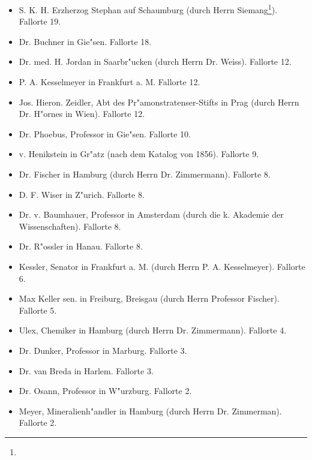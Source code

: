 \documentclass[a4paper, 11pt, oneside]{article}
\begin{document}
\begin{itemize}
    \item S. K. H. Erzherzog Stephan auf Schaumburg (durch Herrn Siemang\footnote{}). Fallorte 19.

    \item Dr. Buchner in Gie"sen. Fallorte 18.

    \item Dr. med. H. Jordan in Saarbr"ucken (durch Herrn Dr. Weiss). Fallorte 12.

    \item P. A. Kesselmeyer in Frankfurt a. M. Fallorte 12.

    \item Jos. Hieron. Zeidler, Abt des Pr"amonstratenser-Stifts in Prag (durch Herrn Dr. H"ornes in Wien). Fallorte 12.

    \item Dr. Phoebus, Professor in Gie"sen. Fallorte 10.

    \item v. Henikstein in Gr"atz (nach dem Katalog von 1856). Fallorte 9.

    \item Dr. Fischer in Hamburg (durch Herrn Dr. Zimmermann). Fallorte 8.

    \item D. F. Wiser in Z"urich. Fallorte 8.

    \item Dr. v. Baumhauer, Professor in Amsterdam (durch die k. Akademie der Wissenschaften). Fallorte 8.

    \item Dr. R"ossler in Hanau. Fallorte 8.

    \item Kessler, Senator in Frankfurt a. M. (durch Herrn P. A. Kesselmeyer). Fallorte 6.

    \item Max Keller sen. in Freiburg, Breisgau (durch Herrn Professor Fischer). Fallorte 5.

    \item Ulex, Chemiker in Hamburg (durch Herrn Dr. Zimmermann). Fallorte 4.

    \item Dr. Dunker, Professor in Marburg. Fallorte 3.

    \item Dr. van Breda in Harlem. Fallorte 3.

    \item Dr. Osann, Professor in W"urzburg. Fallorte 2.

    \item Meyer, Mineralienh"andler in Hamburg (durch Herrn Dr. Zimmerman). Fallorte 2.
\end{itemize}
\end{document}
